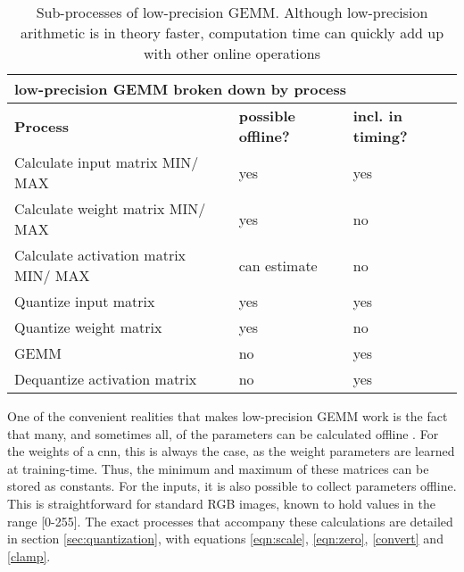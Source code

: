 \begin{table}[]
\centering
\caption[Sub-processes of low-precision GEMM]{Sub-processes of low-precision GEMM. Although low-precision arithmetic is in theory faster, computation time can quickly add up with other online operations}
\label{tbl:gemmlowp}
\begin{tabular}{|l|l|l|}
\hline
\multicolumn{3}{|l|}{low-precision GEMM broken down by process}                                          \\ \hline
\textbf{Process}                & \textbf{possible offline?} & \textbf{incl. in timing?}				 \\ \hline
Calculate input matrix MIN/ MAX  & yes		                 & yes                                       \\ \hline
Calculate weight matrix MIN/ MAX & yes                        & no                                        \\ \hline
Calculate activation matrix MIN/ MAX & can estimate              & no                                        \\ \hline
Quantize input matrix           & yes             		     & yes                                       \\ \hline
Quantize weight matrix          & yes                        & no                                        \\ \hline
GEMM                            & no                         & yes                                       \\ \hline
Dequantize activation matrix    & no                         & yes                                       \\ \hline
\end{tabular}
\end{table}

One of the convenient realities that makes low-precision GEMM work is the fact that many, and sometimes all, of the parameters can be calculated offline \cite{warden_quantize}. For the weights of a cnn, this is always the case, as the weight parameters are learned at training-time. Thus, the minimum and maximum of these matrices can be stored as constants. For the inputs, it is also possible to collect parameters offline. This is straightforward for standard RGB images, known to hold values in the range [0-255]. The exact processes that accompany these calculations are detailed in section \ref{sec:quantization}, with equations \ref{eqn:scale}, \ref{eqn:zero}, \ref{convert} and \ref{clamp}.


